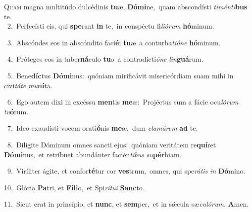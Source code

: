 \lettrine{\initial\textcolor{\initialcolor}{Q}}{uam} magna multitúdo dulcédinis \textbf{tu}\-æ, \textbf{Dó}\-\textbf{mi}ne,~\star quam abscondísti \textit{ti}\-\textit{mén}\textit{ti}\textbf{bus} te.\\
{\numbfont\textcolor{\numbcolor}{~2.}}~Perfecísti eis, qui \textbf{spe}\-rant \textbf{in} te,~\star in conspéctu fi\-\textit{li}\-\textit{ó}\textit{rum} \textbf{hó}\-minum.\par
{\numbfont\textcolor{\numbcolor}{~3.}}~Abscóndes eos in abscóndito faci\-\textbf{é}\-i \textbf{tu}\-æ~\star a conturba\-\textit{ti}\-\textit{ó}\textit{ne} \textbf{hó}\-minum.\par
{\numbfont\textcolor{\numbcolor}{~4.}}~Próteges eos in taber\-\textbf{ná}\-culo \textbf{tu}\-o~\star a contradicti\-\textit{ó}\-\textit{ne} \textit{lin}\-\textbf{guá}rum.\par
{\numbfont\textcolor{\numbcolor}{~5.}}~Bene\-\textbf{díc}\-tus \textbf{Dó}\-\textbf{mi}nus:~\star quóniam mirificávit misericórdiam suam mihi in civi\-\textit{tá}\-\textit{te} \textit{mu}\-\textbf{ní}ta.\par
{\numbfont\textcolor{\numbcolor}{~6.}}~Ego autem dixi in excéssu \textbf{men}\-tis \textbf{me}\-æ:~\star Projéctus sum a fácie ocu\-\textit{ló}\-\textit{rum} \textit{tu}\-\textbf{ó}rum.\par
{\numbfont\textcolor{\numbcolor}{~7.}}~Ideo exaudísti vocem orati\-\textbf{ó}\-nis \textbf{me}\-æ,~\star dum \textit{cla}\-\textit{má}\textit{rem} \textbf{ad} te.\par
{\numbfont\textcolor{\numbcolor}{~8.}}~Dilígite Dóminum omnes sancti ejus:~\dagger quóniam veritátem re\-\textbf{quí}\-ret \textbf{Dó}\-\textbf{mi}nus,~\star et retríbuet abundánter facién\-\textit{ti}\-\textit{bus} \textit{su}\-\textbf{pér}biam.\par
{\numbfont\textcolor{\numbcolor}{~9.}}~Viríliter ágite, et confor\-\textbf{té}\-tur cor \textbf{ves}\-trum,~\star omnes, qui spe\-\textit{rá}\-\textit{tis} \textit{in} \textbf{Dó}\-mino.\par
{\numbfont\textcolor{\numbcolor}{10.}}~Glória \textbf{Pa}\-tri, et \textbf{Fí}\-\textbf{li}o,~\star et Spi\-\textit{rí}\-\textit{tu}\textit{i} \textbf{Sanc}\-to.\par
{\numbfont\textcolor{\numbcolor}{11.}}~Sicut erat in princípio, et \textbf{nunc}\-, et \textbf{sem}\-per,~\star et in sǽcula sæ\-\textit{cu}\-\textit{ló}\textit{rum}. \textbf{A}\-men.\par

